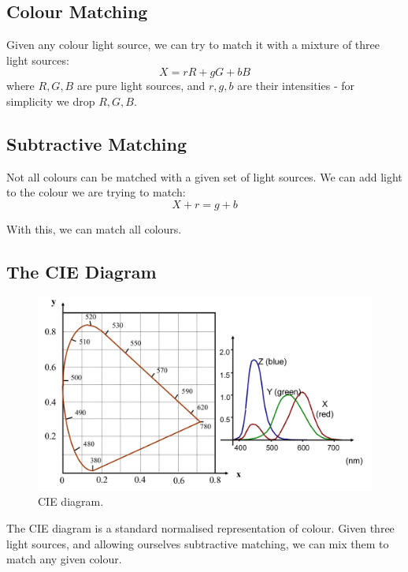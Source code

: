 \documentclass[11pt]{article}
\begin{document}
\subsection{Colour Matching}
Given any colour light source, we can try to match it with a mixture of three light sources:
\[
  X = rR + gG + bB 
\]
where $R, G, B$ are pure light sources, and $r, g, b$ are their intensities - for simplicity we drop $R, G, B$.

\subsection{Subtractive Matching}
Not all colours can be matched with a given set of light sources.
We can add light to the colour we are trying to match:
\[
  X + r = g + b 
\]

With this, we can match all colours.

\subsection{The CIE Diagram}
\begin{figure}[htb!]
  \centering
  \caption{CIE diagram.}
  \includegraphics[scale=0.3]{cie}
\end{figure}
The CIE diagram is a standard normalised representation of colour.
Given three light sources, and allowing ourselves subtractive matching, we can mix them to match any given colour.
\end{document}
